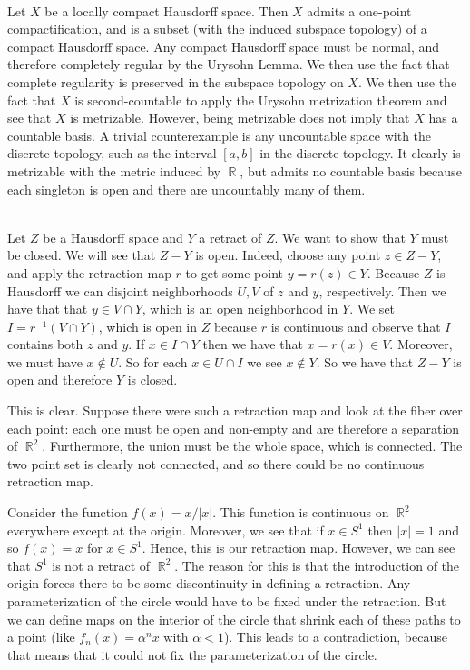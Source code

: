 \documentclass{article}
\DeclareMathOperator{\R}{\mathbb{R}}
\newcommand{\problem}[1]{\noindent{\textbf{Problem #1}}\\}
\newcommand{\problempart}[1]{\noindent{\textbf{(#1)}}}
\begin{document}
\problem{4.34.4} Let $X$ be a locally compact Hausdorff space. Then $X$ admits a one-point compactification, and is a subset (with the induced subspace topology) of a compact Hausdorff space. Any compact Hausdorff space must be normal, and therefore completely regular by the Urysohn Lemma. We then use the fact that complete regularity is preserved in the subspace topology on $X$. We then use the fact that $X$ is second-countable to apply the Urysohn metrization theorem and see that $X$ is metrizable. However, being metrizable does not imply that $X$ has a countable basis. A trivial counterexample is any uncountable space with the discrete topology, such as the interval $[a,b]$ in the discrete topology. It clearly is metrizable with the metric induced by $\R$, but admits no countable basis because each singleton is open and there are uncountably many of them.  

\problem{4.35.4}
\problempart{a} Let $Z$ be a Hausdorff space and $Y$ a retract of $Z$. We want to show that $Y$ must be closed. We will see that $Z - Y$ is open. Indeed, choose any point $z \in Z - Y$, and apply the retraction map $r$ to get some point $y = r(z) \in Y$. Because $Z$ is Hausdorff we can disjoint neighborhoods $U,V$ of $z$ and $y$, respectively. Then we have that that $y \in V \cap Y$, which is an open neighborhood in $Y$. We set $I = r^{-1}(V\cap Y)$, which is open in $Z$ because $r$ is continuous and observe that $I$ contains both $z$ and $y$. If $x \in I \cap Y$ then we have that $x = r(x) \in V$. Moreover, we must have $x \not\in U$. So for each $x \in U \cap I$ we see $x \not\in Y$. So we have that $Z - Y$ is open and therefore $Y$ is closed.   

\problempart{b} This is clear. Suppose there were such a retraction map and look at the fiber over each point: each one must be open and non-empty and are therefore a separation of $\R^2$. Furthermore, the union must be the whole space, which is connected. The two point set is clearly not connected, and so there could be no continuous retraction map. 

\problempart{c} Consider the function $f(x) = x/|x|$. This function is continuous on $\R^2$ everywhere except at the origin. Moreover, we see that if $x \in S^1$ then $|x| = 1$ and so $f(x) = x$ for $x \in S^1$. Hence, this is our retraction map. However, we can see that $S^1$ is not a retract of $\R^2$. The reason for this is that the introduction of the origin forces there to be some discontinuity in defining a retraction. Any parameterization of the circle would have to be fixed under the retraction. But we can define maps on the interior of the circle that shrink each of these paths to a point (like $f_n(x) = \alpha^nx$ with $\alpha < 1$). This leads to a contradiction, because that means that it could not fix the parameterization of the circle. 
\end{document}
